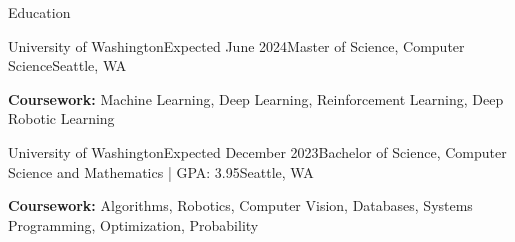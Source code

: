 \documentclass{resume} %
\begin{document}
\vspace{-0.6em} %


\begin{rSection}{Education}

\begin{education}{University of Washington}{Expected June 2024}{Master of Science, Computer Science}{Seattle, WA}
\item \textbf{Coursework:} Machine Learning, Deep Learning, Reinforcement Learning, Deep Robotic Learning
\end{education}

\begin{education}{University of Washington}{Expected December 2023}{Bachelor of Science, Computer Science and Mathematics | GPA: 3.95}{Seattle, WA}
\item \textbf{Coursework:} Algorithms, Robotics, Computer Vision, Databases, Systems Programming, Optimization, Probability
\end{education}

\end{rSection}

\end{document}
